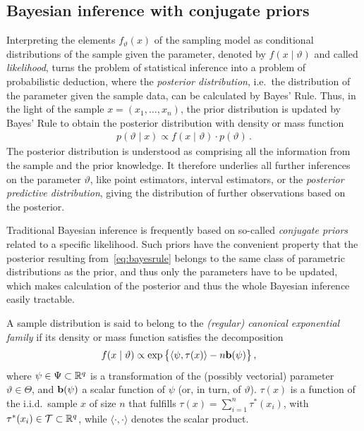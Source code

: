 \subsection{Bayesian inference with conjugate priors}
\label{sec:regularconjugates}


Interpreting the elements $f_\vartheta(x)$ of the sampling model as conditional distributions of the sample given the parameter,
denoted by $f(x\mid\vartheta)$ and called \emph{likelihood},
turns the problem of statistical inference into a problem of probabilistic deduction,
where the \emph{posterior distribution}, i.e.\ the distribution of the parameter given the sample data,
can be calculated by Bayes' Rule.
Thus, in the light of the sample $x= (x_1, \ldots, x_n)$, the prior distribution is updated by Bayes' Rule
to obtain the posterior distribution with density or mass function
\begin{align}
\label{eq:bayesrule}
p(\vartheta\mid x) \propto f(x\mid\vartheta) \cdot p(\vartheta)\,.
\end{align}
The posterior distribution is understood as comprising all the information from the sample and the prior knowledge.
It therefore underlies all further inferences on the parameter $\vartheta$,
like point estimators, interval estimators,
or the \emph{posterior predictive distribution},
giving the distribution of further observations based on the posterior.

Traditional Bayesian inference is frequently based on so-called \emph{conjugate priors} related to a specific likelihood.
Such priors have the convenient property that the posterior resulting from~\eqref{eq:bayesrule}
belongs to the same class of parametric distributions as the prior, and thus only the parameters have to be updated,
which makes calculation of the posterior and thus the whole Bayesian inference easily tractable.%

A sample distribution
is said to belong to the \emph{(regular) canonical exponential family} if its density or mass function satisfies the decomposition
\begin{align}
\label{eq:expofam-sampledens}
f(x \mid \vartheta) &\propto \exp\big\{\langle \psi, \tau(x) \rangle - n \mathbf{b}(\psi)\big\}\,,
\end{align}
where $\psi \in \Psi \subset \mathbb{R}^q$ is a transformation of the (possibly vectorial) parameter $\vartheta \in \Theta$,
and $\mathbf{b}(\psi)$ a scalar function of $\psi$ (or, in turn, of $\vartheta$).
$\tau(x)$ is a function of the i.i.d.\ sample $x$ of size $n$ that fulfills $\tau(x) = \sum_{i=1}^n \tau^*(x_i)$,
with $\tau^*(x_i) \in \mathcal{T} \subset \mathbb{R}^q$,
while $\langle\cdot, \cdot\rangle$ denotes the scalar product.

